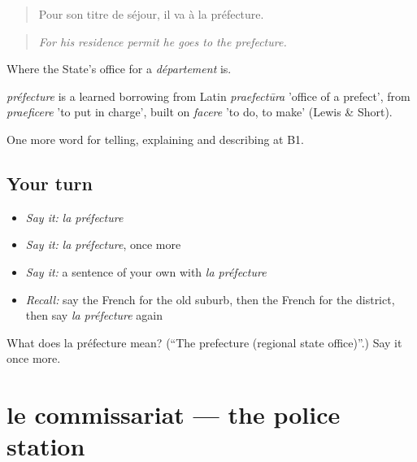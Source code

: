 \begin{quote}
Pour son titre de séjour, il va à la préfecture.
\end{quote}

\begin{quote}
\emph{For his residence permit he goes to the prefecture.}
\end{quote}

Where the State's office for a \emph{département} is.

\begin{cousinweb}
\emph{préfecture} is a learned borrowing from Latin \emph{praefectūra} 'office of a prefect', from \emph{praeficere} 'to put in charge', built on \emph{facere} 'to do, to make' (Lewis \& Short).
\end{cousinweb}

\begin{grammarlens}[title={What you've built}]
One more word for telling, explaining and describing at B1.
\end{grammarlens}

\subsection*{Your turn}
\begin{itemize}
\raggedright
  \item \emph{Say it:} \emph{la préfecture}
  \item \emph{Say it:} \emph{la préfecture}, once more
  \item \emph{Say it:} a sentence of your own with \emph{la préfecture}
  \item \emph{Recall:} say the French for the old suburb, then the French for the district, then say \emph{la préfecture} again
\end{itemize}

\begin{tcolorbox}[breakable,colback=teal!4,colframe=teal!35!black,title={Before you move on}]
What does la préfecture mean? (\textquotedblleft{}The prefecture (regional state office)\textquotedblright{}.) Say it once more.
\end{tcolorbox}
\section[le commissariat]{le commissariat — the police station}

\label{lesson:FR-C440-commissariat}



